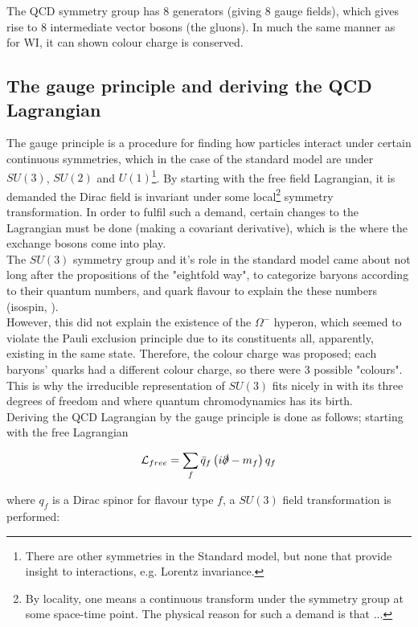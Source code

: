 \documentclass[11pt,a4paper]{article}
\begin{document}
The QCD symmetry group has 8 generators (giving 8 gauge fields), which gives rise to 8 intermediate vector bosons (the gluons). In much the same manner as for WI, it can shown colour charge is conserved.

\subsection{The gauge principle and deriving the QCD Lagrangian}
The gauge principle is a procedure for finding how particles interact under certain continuous symmetries, which in the case of the standard model are under $SU(3)$, $SU(2)$ and $U(1)$\footnote{There are other symmetries in the Standard model, but none that provide insight to interactions, e.g. Lorentz invariance.}. By starting with the free field Lagrangian, it is demanded the Dirac field is invariant under some local\footnote{By locality, one means a continuous transform under the symmetry group at some space-time point. The physical reason for such a demand is that ...} symmetry transformation. In order to fulfil such a demand, certain changes to the Lagrangian must be done (making a covariant derivative), which is the where the exchange bosons come into play.\\

The $SU(3)$ symmetry group and it's role in the standard model came about not long after the propositions of the "eightfold way", to categorize baryons according to their quantum numbers, and quark flavour to explain the these numbers (isospin, ).\\
However, this did not explain the existence of the $\Omega^-$ hyperon, which seemed to violate the Pauli exclusion principle due to its constituents all, apparently, existing in the same state. Therefore, the colour charge was proposed; each baryons' quarks had a different colour charge, so there were 3 possible "colours". This is why the irreducible representation of $SU(3)$ fits nicely in with its three degrees of freedom and where quantum chromodynamics has its birth.\\

Deriving the QCD Lagrangian by the gauge principle is done as follows; starting with the free Lagrangian

\begin{equation}
	\mathcal{L}_{free} = \sum_f \bar{q}_f\left(i\slashed \partial - m_f\right)q_f
\end{equation}

where $q_f$ is a Dirac spinor for flavour type $f$, a $SU(3)$ field transformation is performed:
\end{document}
